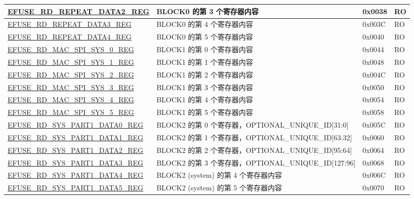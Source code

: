 \begin{longtable}{ | p{6cm} | p{7.2cm} | p{1.3cm} | p{1cm} | }
\hyperref[regdesc:EFUSERDREPEATDATA2REG]{EFUSE\_RD\_REPEAT\_DATA2\_REG} & BLOCK0 的第 3 个寄存器内容  & 0x0038 & RO \\ \hline
\hyperref[regdesc:EFUSERDREPEATDATA3REG]{EFUSE\_RD\_REPEAT\_DATA3\_REG} & BLOCK0 的第 4 个寄存器内容  & 0x003C & RO \\ \hline
\hyperref[regdesc:EFUSERDREPEATDATA4REG]{EFUSE\_RD\_REPEAT\_DATA4\_REG} & BLOCK0 的第 5 个寄存器内容  & 0x0040 & RO \\ \hline
\hyperref[regdesc:EFUSERDMACSPISYS0REG]{EFUSE\_RD\_MAC\_SPI\_SYS\_0\_REG} & BLOCK1 的第 0 个寄存器内容  & 0x0044 & RO \\ \hline
\hyperref[regdesc:EFUSERDMACSPISYS1REG]{EFUSE\_RD\_MAC\_SPI\_SYS\_1\_REG} & BLOCK1 的第 1 个寄存器内容  & 0x0048 & RO \\ \hline
\hyperref[regdesc:EFUSERDMACSPISYS2REG]{EFUSE\_RD\_MAC\_SPI\_SYS\_2\_REG} & BLOCK1 的第 2 个寄存器内容  & 0x004C & RO \\ \hline
\hyperref[regdesc:EFUSERDMACSPISYS3REG]{EFUSE\_RD\_MAC\_SPI\_SYS\_3\_REG} & BLOCK1 的第 3 个寄存器内容  & 0x0050 & RO \\ \hline
\hyperref[regdesc:EFUSERDMACSPISYS4REG]{EFUSE\_RD\_MAC\_SPI\_SYS\_4\_REG} & BLOCK1 的第 4 个寄存器内容  & 0x0054 & RO \\ \hline
\hyperref[regdesc:EFUSERDMACSPISYS5REG]{EFUSE\_RD\_MAC\_SPI\_SYS\_5\_REG} & BLOCK1 的第 5 个寄存器内容  & 0x0058 & RO \\ \hline
\hyperref[regdesc:EFUSERDSYSPART1DATA0REG]{EFUSE\_RD\_SYS\_PART1\_DATA0\_REG} & BLOCK2 的第 0 个寄存器，OPTIONAL\_UNIQUE\_ID[31:0]  & 0x005C & RO \\ \hline
\hyperref[regdesc:EFUSERDSYSPART1DATA1REG]{EFUSE\_RD\_SYS\_PART1\_DATA1\_REG} & BLOCK2 的第 1 个寄存器，OPTIONAL\_UNIQUE\_ID[63:32]  & 0x0060 & RO \\ \hline
\hyperref[regdesc:EFUSERDSYSPART1DATA2REG]{EFUSE\_RD\_SYS\_PART1\_DATA2\_REG} & BLOCK2 的第 2 个寄存器，OPTIONAL\_UNIQUE\_ID[95:64]  & 0x0064 & RO \\ \hline
\hyperref[regdesc:EFUSERDSYSPART1DATA3REG]{EFUSE\_RD\_SYS\_PART1\_DATA3\_REG} & BLOCK2 的第 3 个寄存器，OPTIONAL\_UNIQUE\_ID[127:96]  & 0x0068 & RO \\ \hline
\hyperref[regdesc:EFUSERDSYSPART1DATA4REG]{EFUSE\_RD\_SYS\_PART1\_DATA4\_REG} & BLOCK2 (system) 的第 4 个寄存器内容  & 0x006C & RO \\ \hline
\hyperref[regdesc:EFUSERDSYSPART1DATA5REG]{EFUSE\_RD\_SYS\_PART1\_DATA5\_REG} & BLOCK2 (system) 的第 5 个寄存器内容  & 0x0070 & RO \\ \hline

\end{longtable}
